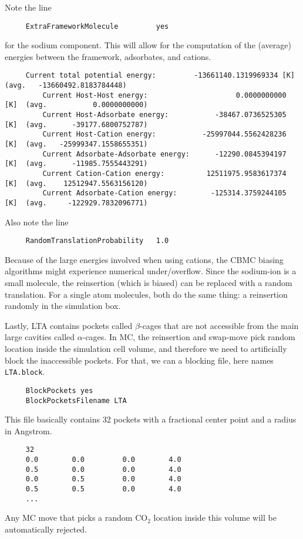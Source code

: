 \noindent
Note the line
\begin{tiny}
\begin{verbatim}
     ExtraFrameworkMolecule         yes
\end{verbatim}
\end{tiny}
for the sodium component. This will allow for the computation of the (average) energies between the framework, adsorbates, and cations.
\begin{tiny}
\begin{verbatim}
     Current total potential energy:         -13661140.1319969334 [K]  (avg.   -13660492.8183784448)
         Current Host-Host energy:                     0.0000000000 [K]  (avg.           0.0000000000)
         Current Host-Adsorbate energy:           -38467.0736525305 [K]  (avg.      -39177.6800752787)
         Current Host-Cation energy:           -25997044.5562428236 [K]  (avg.   -25999347.1558655351)
         Current Adsorbate-Adsorbate energy:      -12290.0845394197 [K]  (avg.      -11985.7555443291)
         Current Cation-Cation energy:          12511975.9583617374 [K]  (avg.    12512947.5563156120)
         Current Adsorbate-Cation energy:        -125314.3759244105 [K]  (avg.     -122929.7832096771)
\end{verbatim}
\end{tiny}
Also note the line
\begin{tiny}
\begin{verbatim}
     RandomTranslationProbability   1.0
\end{verbatim}
\end{tiny}
Because of the large energies involved when using cations, the CBMC biasing algorithms might experience numerical under/overflow.
Since the sodium-ion is a small molecule, the reinsertion (which is biased) can be replaced with a random translation.
For a single atom molecules, both do the same thing: a reinsertion randomly in the simulation box.

\noindent
Lastly, LTA contains pockets called $\beta$-cages that are not accessible from the main large cavities called $\alpha$-cages.
In MC, the reinsertion and swap-move pick random location inside the simulation cell volume, and therefore we need to artificially block
the inaccessible pockets. For that, we can a blocking file, here names \verb+LTA.block+.
\begin{tiny}
\begin{verbatim}
     BlockPockets yes
     BlockPocketsFilename LTA
\end{verbatim}
This file basically contains 32 pockets with a fractional center point and a radius in Angstrom.
\end{tiny}
\begin{tiny}
\begin{verbatim}
     32
     0.0        0.0         0.0        4.0
     0.5        0.0         0.0        4.0
     0.0        0.5         0.0        4.0
     0.5        0.5         0.0        4.0
     ...
\end{verbatim}
\end{tiny}
Any MC move that picks a random CO$_2$ location inside this volume will be automatically rejected.

